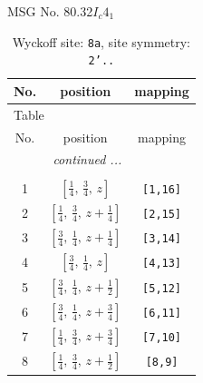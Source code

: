 \documentclass[fleqn,8pt]{jsarticle}
\begin{document}
\setcounter{MaxMatrixCols}{32}

\renewcommand{\tablename}{Table~}
\renewcommand{\figurename}{Figure~}
\begin{center}
\LARGE
MSG No. 80.32\quad$I_{c}4_{1}$
\end{center}
\renewcommand{\arraystretch}{1.2}
\begin{longtable}{ccc}
\caption{Wyckoff site: {\tt 8a}, site symmetry: {\tt 2'..}}
 \\
 \hline \hline
No. & position & mapping \\ \hline \endfirsthead

\multicolumn{2}{l}{\tablename\ \thetable{}} \\
 \hline \hline
No. & position & mapping \\ \hline \endhead

 \hline \hline
\multicolumn{2}{r}{\footnotesize\it continued ...} \\ \endfoot

 \hline \hline
\multicolumn{2}{r}{} \\ \endlastfoot

1 & $\left[ \frac{1}{4},\, \frac{3}{4},\, z \right]$ & {\tt [1,16]} \\ \hline
2 & $\left[ \frac{1}{4},\, \frac{3}{4},\, z + \frac{1}{4} \right]$ & {\tt [2,15]} \\ \hline
3 & $\left[ \frac{3}{4},\, \frac{1}{4},\, z + \frac{1}{4} \right]$ & {\tt [3,14]} \\ \hline
4 & $\left[ \frac{3}{4},\, \frac{1}{4},\, z \right]$ & {\tt [4,13]} \\ \hline
5 & $\left[ \frac{3}{4},\, \frac{1}{4},\, z + \frac{1}{2} \right]$ & {\tt [5,12]} \\ \hline
6 & $\left[ \frac{3}{4},\, \frac{1}{4},\, z + \frac{3}{4} \right]$ & {\tt [6,11]} \\ \hline
7 & $\left[ \frac{1}{4},\, \frac{3}{4},\, z + \frac{3}{4} \right]$ & {\tt [7,10]} \\ \hline
8 & $\left[ \frac{1}{4},\, \frac{3}{4},\, z + \frac{1}{2} \right]$ & {\tt [8,9]} \\
\end{longtable}
\renewcommand{\arraystretch}{1.2}
\end{document}
